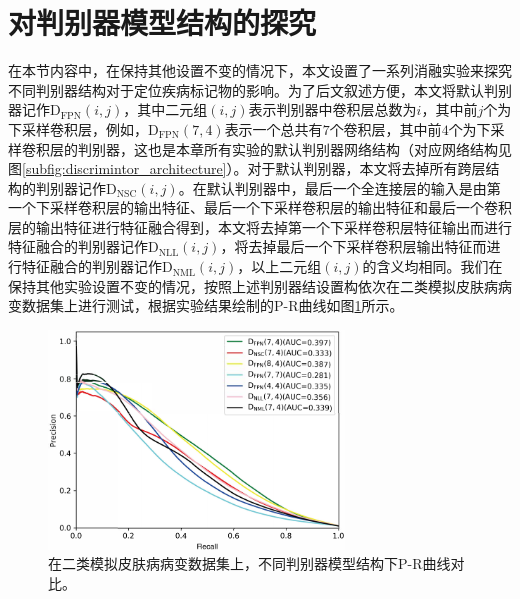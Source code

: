 \section{对判别器模型结构的探究}\label{sec:dis_arch}
在本节内容中，在保持其他设置不变的情况下，本文设置了一系列消融实验来探究不同判别器结构对于定位疾病标记物的影响。为了后文叙述方便，本文将默认判别器记作$\mathrm{D}_\mathrm{FPN}(i,j)$，其中二元组$(i,j)$表示判别器中卷积层总数为$i$，其中前$j$个为下采样卷积层，例如，$\mathrm{D}_\mathrm{FPN}(7,4)$表示一个总共有$7$个卷积层，其中前$4$个为下采样卷积层的判别器，这也是本章所有实验的默认判别器网络结构（对应网络结构见图\ref{subfig:discrimintor_architecture}）。对于默认判别器，本文将去掉所有跨层结构的判别器记作$\mathrm{D}_\mathrm{NSC}(i,j)$。在默认判别器中，最后一个全连接层的输入是由第一个下采样卷积层的输出特征、最后一个下采样卷积层的输出特征和最后一个卷积层的输出特征进行特征融合得到，本文将去掉第一个下采样卷积层特征输出而进行特征融合的判别器记作$\mathrm{D}_\mathrm{NLL}(i,j)$，将去掉最后一个下采样卷积层输出特征而进行特征融合的判别器记作$\mathrm{D}_\mathrm{NML}(i,j)$，以上二元组$(i,j)$的含义均相同。我们在保持其他实验设置不变的情况，按照上述判别器结设置构依次在二类模拟皮肤病病变数据集上进行测试，根据实验结果绘制的P-R曲线如图\ref{fig:pr_curve_skin_dis_arch}所示。
\begin{figure}[h]
	\centering
	\includegraphics[width=0.7\textwidth]{figure/pr_curve_dis_arch/pr_curve.pdf}
	\caption[不同判别器模型结构下P-R曲线对比]{在二类模拟皮肤病病变数据集上，不同判别器模型结构下P-R曲线对比。} 
	\label{fig:pr_curve_skin_dis_arch}
\end{figure}


